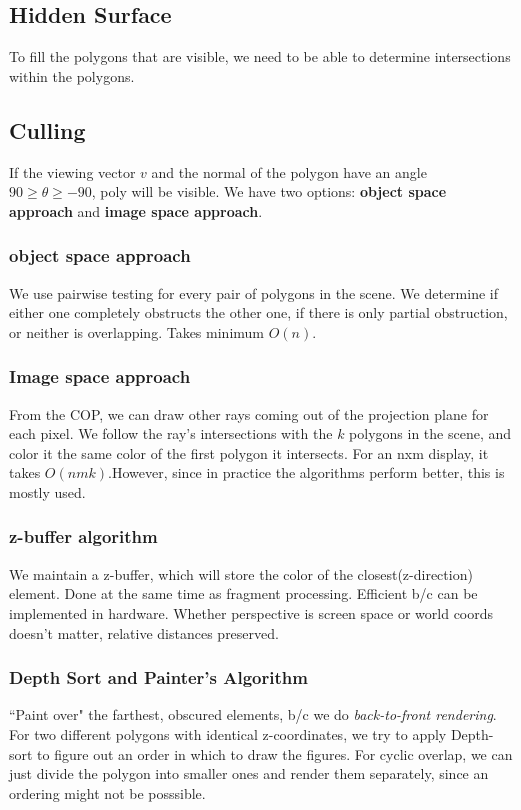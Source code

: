 \documentclass[landscape,4pt,a4paper]{article}
\begin{document}
\begin{multicols*}{5}
	\section{Hidden Surface}
		To fill the polygons that are visible, we need to be able to determine intersections within the polygons.
		\subsection{Culling}
			If the viewing vector $v$ and the normal of the polygon have an angle $90\geq \theta \geq -90$, poly 
			will be visible. We have two options: \textbf{object space approach} and \textbf{image space approach}.
			\subsubsection{object space approach}
				We use pairwise testing for every pair of polygons in the scene. We determine if either one completely
				obstructs the other one, if there is only partial obstruction, or neither is overlapping. Takes minimum 
				$O(n)$.
			\subsubsection{Image space approach}
				From the COP, we can draw other rays coming out of the projection plane for each pixel. We follow the 
				ray's intersections with the $k$ polygons in the scene, and color it the same color of the first polygon
				it intersects. For an nxm display, it takes $O(nmk)$.However, since in practice the algorithms perform 
				better, this is mostly used. 
			\subsubsection{z-buffer algorithm}
				We maintain a z-buffer, which will store the color of the closest(z-direction) element. Done at the same time as 
				fragment processing. Efficient b/c can be implemented in hardware. Whether perspective is screen space or world
				coords doesn't matter, relative distances preserved.
			\subsubsection{Depth Sort and Painter's Algorithm}
				``Paint over" the farthest, obscured elements, b/c we do \textit{back-to-front rendering}. For two different
				polygons with identical z-coordinates, we try to apply Depth-sort to figure out an order in which to draw 
				the figures. For cyclic overlap, we can just divide the polygon into smaller ones and render them separately,
				since an ordering might not be posssible.

\end{multicols*}
\end{document}
